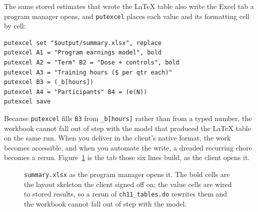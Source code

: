 \documentclass[
    a4paper,
    fontsize=10pt,
    twoside=true,
    numbers=noenddot,
]{kaobook}
\begin{document}
The same stored estimates that wrote the \LaTeX{} table also write the Excel tab a program manager opens, and \texttt{putexcel} places each value and its formatting cell by cell:
\par
{\footnotesize
\begin{verbatim}
putexcel set "$output/summary.xlsx", replace
putexcel A1 = "Program earnings model", bold
putexcel A2 = "Term" B2 = "Dose + controls", bold
putexcel A3 = "Training hours ($ per qtr each)"
putexcel B3 = (_b[hours])
putexcel A4 = "Participants" B4 = (e(N))
putexcel save
\end{verbatim}
}
Because \texttt{putexcel} fills \texttt{B3} from \texttt{\_b[hours]} rather than from a typed number, the workbook cannot fall out of step with the model that produced the \LaTeX{} table on the same run. When you deliver in the client's native format, the work becomes accessible, and when you automate the write, a dreaded recurring chore becomes a rerun. Figure~\ref{fig:ch11-viz-workbook} is the tab those six lines build, as the client opens it.

\begin{figure}[htbp]
\centering
{}
\caption[The generated summary tab]{\texttt{summary.xlsx} as the program manager opens it. The bold cells are the layout skeleton the client signed off on; the value cells are wired to stored results, so a rerun of \texttt{ch11\_tables.do} rewrites them and the workbook cannot fall out of step with the model.}
\label{fig:ch11-viz-workbook}
\end{figure}
\end{document}
